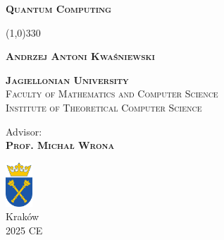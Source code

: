 \begin{titlepage}
    \begin{center}

        \Huge
        \textbf{\textsc{Quantum Computing}}

        \vspace{0.5cm}
        \Large
        \line(1,0){330}

        \vspace{5mm}

        \textbf{\textsc{Andrzej Antoni Kwaśniewski}}

        \vspace{1cm}


        \textbf{\textsc{Jagiellonian University}} \\
        {\textsc{Faculty of Mathematics and Computer Science}}\\
        {\textsc{Institute of Theoretical Computer Science}}

        \vspace{1cm}

        \Large
        Advisor: \\
        \textbf{\textsc{Prof. Michał Wrona}}

        \vfill

       \includegraphics[width=1cm]{figures/uj-logo-kolor.png} \\
        Kraków \\
        2025 CE
    \end{center}
\end{titlepage}
